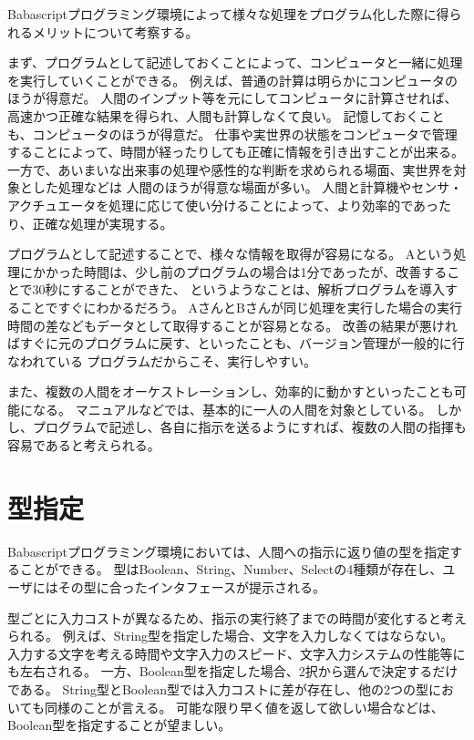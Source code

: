 Babascriptプログラミング環境によって様々な処理をプログラム化した際に得られるメリットについて考察する。

まず、プログラムとして記述しておくことによって、コンピュータと一緒に処理を実行していくことができる。
例えば、普通の計算は明らかにコンピュータのほうが得意だ。
人間のインプット等を元にしてコンピュータに計算させれば、高速かつ正確な結果を得られ、人間も計算しなくて良い。
記憶しておくことも、コンピュータのほうが得意だ。
仕事や実世界の状態をコンピュータで管理することによって、時間が経ったりしても正確に情報を引き出すことが出来る。
一方で、あいまいな出来事の処理や感性的な判断を求められる場面、実世界を対象とした処理などは
人間のほうが得意な場面が多い。
人間と計算機やセンサ・アクチュエータを処理に応じて使い分けることによって、より効率的であったり、正確な処理が実現する。

プログラムとして記述することで、様々な情報を取得が容易になる。
Aという処理にかかった時間は、少し前のプログラムの場合は1分であったが、改善することで30秒にすることができた、
というようなことは、解析プログラムを導入することですぐにわかるだろう。
AさんとBさんが同じ処理を実行した場合の実行時間の差などもデータとして取得することが容易となる。
改善の結果が悪ければすぐに元のプログラムに戻す、といったことも、バージョン管理が一般的に行なわれている
プログラムだからこそ、実行しやすい。

また、複数の人間をオーケストレーションし、効率的に動かすといったことも可能になる。
マニュアルなどでは、基本的に一人の人間を対象としている。
しかし、プログラムで記述し、各自に指示を送るようにすれば、複数の人間の指揮も容易であると考えられる。

\section{型指定}\label{ux578bux6307ux5b9a}

Babascriptプログラミング環境においては、人間への指示に返り値の型を指定することができる。
型はBoolean、String、Number、Selectの4種類が存在し、ユーザにはその型に合ったインタフェースが提示される。

型ごとに入力コストが異なるため、指示の実行終了までの時間が変化すると考えられる。
例えば、String型を指定した場合、文字を入力しなくてはならない。
入力する文字を考える時間や文字入力のスピード、文字入力システムの性能等にも左右される。
一方、Boolean型を指定した場合、2択から選んで決定するだけである。
String型とBoolean型では入力コストに差が存在し、他の2つの型においても同様のことが言える。
可能な限り早く値を返して欲しい場合などは、Boolean型を指定することが望ましい。

